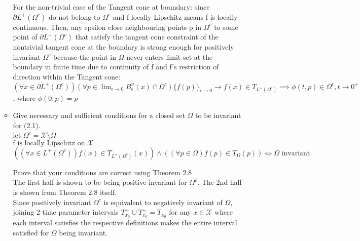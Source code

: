\documentclass[12pt,letter]{article}
\begin{document}
\begin{itemize}
\begin{itemize}
      For the non-trivial case of the Tangent cone at boundary: since $\partial L^+(\Omega^c)$ do not belong to $\Omega^c$ and f locally Lipschitz means f is locally continuous. Then, any epsilon close neighbouring points p in $\Omega^c$ to some point of $\partial L^+(\Omega^c)$ that satisfy the tangent cone constraint of the nontrivial tangent cone at the boundary is strong enough for positively invariant $\Omega^c$ because the point in $\Omega$ never enters limit set at the boundary in finite time due to continuity of f and f's restriction of direction within the Tangent cone:\\
      
      $(\forall x \in \partial L^+(\Omega^c))(\forall p \in \lim_{\epsilon \rightarrow 0} B_\epsilon^n(x) \cap \Omega^c) \{f(p)\}_{\epsilon \rightarrow 0} \rightarrow f(x) \in T_{L^+(\Omega^c)} \implies \phi(t,p) \in \Omega^c, t \rightarrow 0^+$, where $\phi(0,p)=p$\\
      
    \item Give necessary and sufficient conditions for a closed set $\Omega$ to be invariant for (2.1). \\

      let $\Omega^c=\mathcal{X} \setminus \Omega$\\
      $\text{f is locally Lipschitz on }\mathcal{X}$\\
      $((\forall x \in L^+(\Omega^c)) f(x) \in T_{L^+(\Omega^c)}(x)) \wedge ((\forall p \in \Omega) f(p) \in T_{\Omega}(p)) \iff \Omega \text{ invariant}$\\
      

      \pagebreak
      
      Prove that your conditions are correct using Theorem 2.8\\

      The first half is shown to be being positive invariant for $\Omega^c$. The 2nd half is shown from Theorem 2.8 itself.\\
      
      Since positively invariant $\Omega^c$ is equivalent to negatively invariant of $\Omega$, joining 2 time parameter intervals $T_{x_0}^+ \cup T_{x_0}^-=T_{x_0}$ for any $x \in \mathcal{X}$ where each interval satisfies the respective definitions makes the entire interval satisfied for $\Omega$ being invariant.\\
  
    \end{itemize}
  

\end{itemize}
\end{document}
